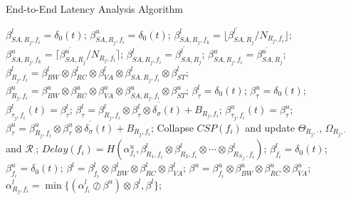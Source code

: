 \documentclass[10pt,journal]{IEEEtran}
\begin{document}
\begin{algorithm}
\caption{End-to-End Latency Analysis Algorithm}
\label{alg:equivalentservicecurve}
\begin{algorithmic}[1]
            \STATE $\beta_{SA,R_j,f_i}^l=\delta_0(t)$; $\beta_{SA,R_j,f_i}^u=\delta_0(t)$;
        \ENDFOR
    \ENDFOR
                    \STATE $\beta_{SA,R_j,f_k}^{l}=\lfloor\beta_{SA,R_j}^{l^\prime}/N_{R_j,f_i}\rfloor$;
                    \STATE $\beta_{SA,R_j,f_k}^{u}=\lceil\beta_{SA,R_j}^{u^\prime}/N_{R_j,f_i}\rceil$;
                \ENDFOR
            \ENDIF
                \STATE $\beta_{SA,R_j,f_i}^l=\beta_{SA,R_j}^{l^\prime}$; $\beta_{SA,R_j,f_i}^u=\beta_{SA,R_j}^{u^\prime}$;
            \ENDIF
            \STATE $\beta_{R_j,f_i}^l=\beta_{BW}^l\otimes\beta_{RC}^l\otimes\beta_{VA}^l\otimes\beta_{SA,R_j,f_i}^l\otimes \beta_{ST}^l$;
            \STATE $\beta_{R_j,f_i}^u=\beta_{BW}^u\otimes\beta_{RC}^u\otimes\beta_{VA}^u\otimes\beta_{SA,R_j,f_i}^u\otimes \beta_{ST}^u$;
        \ENDFOR
        \STATE $\beta_{\tau}^l=\delta_0(t)$; $\beta_{\tau}^u=\delta_0(t)$;
            \STATE $\beta^{l}_{\tau_j,f_i}(t)=\beta_{\tau}^l$; $\beta_{\tau}^l=\overline{\beta^l_{R_j,f_i}\otimes\beta^{l}_{\tau}\otimes\delta_\sigma(t)+B_{R_j,f_i}}$;
            \STATE $\beta^{u}_{\tau_j,f_i}(t)=\beta_{\tau}^u$; $\beta_{\tau}^u=\overline{\beta^u_{R_j,f_i}\otimes\beta^{u}_{\tau}\otimes\delta_\sigma(t)+B_{R_j,f_i}}$;
        \ENDFOR
        \STATE Collapse $CSP(f_i)$ and update $\Theta_{R_j,\cdot}$, $\Omega_{R_j,\cdot}$ and $\mathcal{R}_{\cdot}$;
        \STATE $Delay(f_i)=H(\alpha^u_{f_i},\beta^l_{R_1,f_i}\otimes\beta^l_{R_2,f_i}\otimes\cdots\otimes\beta^l_{R_{N_{f_i}},f_i})$;
        \STATE $\beta_{f_i}^l=\delta_0(t)$; $\beta_{f_i}^u=\delta_0(t)$;
            \STATE $\beta^l=\beta^l_{f_i}\otimes\beta_{BW}^l\otimes\beta_{RC}^l\otimes\beta_{VA}^l$;
            \STATE $\beta^u=\beta^u_{f_i}\otimes\beta_{BW}^u\otimes\beta_{RC}^u\otimes\beta_{VA}^u$;
            \STATE $\alpha^l_{R_j,f_i}=\min\{(\alpha^l_{f_i}\oslash\beta^u)\otimes\beta^l,\beta^l\}$;

\end{algorithmic}
\end{algorithm}
\end{document}
